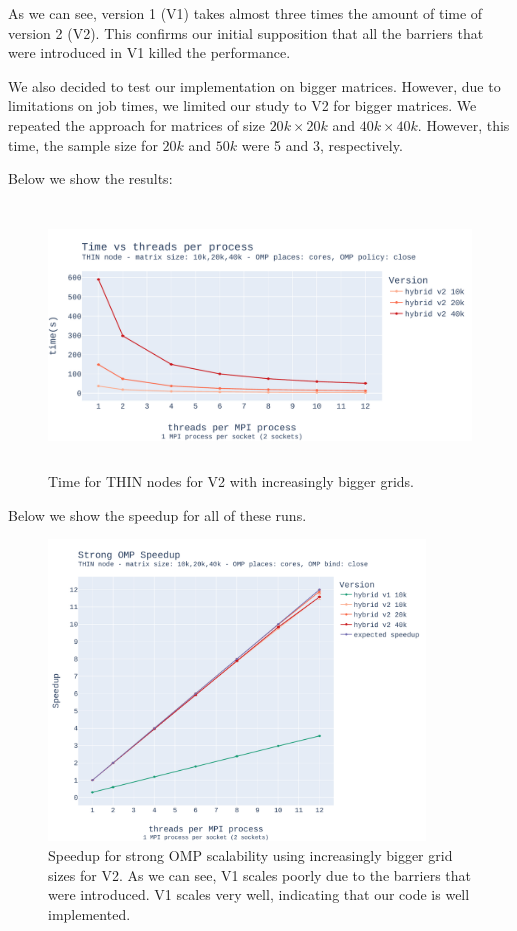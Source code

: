 \documentclass{report}
\begin{document}
As we can see, version 1 (V1) takes almost three times the amount of time of 
version 2 (V2). This confirms our initial supposition that all the barriers 
that were introduced in V1 killed the performance. 

We also decided to test our implementation on bigger matrices. However, due to 
limitations on job times, we limited our study to V2 for bigger matrices. 
We repeated the approach for matrices of size $20k\times 20k$ and $40k\times 40k$. 
However, this time, the sample size for $20k$ and $50k$ were 5 and 3, respectively.

Below we show the results: 

\begin{figure}[H]
\centering
\includegraphics[width=14cm, height=7cm]{./images/strong_OMP_thin_hybrid_v2.pdf}
\caption{\label{fig:strongompv2thin} Time for THIN nodes for V2 with increasingly
bigger grids.}
\end{figure}

Below we show the speedup for all of these runs.

\begin{figure}[H]
\centering
\includegraphics[width=10cm, height=8cm]{./images/strong_OMP_thin_hybrid_speedup.pdf}
\caption{\label{fig:strongompspeedupthin} Speedup for strong OMP scalability using 
increasingly bigger grid sizes for V2. As we can see, V1 scales poorly due to the 
barriers that were introduced. V1 scales very well, indicating that our code 
is well implemented.}
\end{figure}
\end{document}
